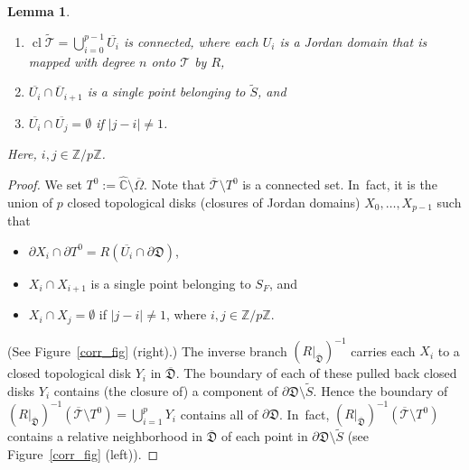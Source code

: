 \documentclass[JEP,XML,SOM,Unicode,NoFloatCountersInSection,published]{cedram}
\newtheorem{lemma}{Lemma}[section]
\theoremstyle{definition}
\theoremstyle{remark}
\newcommand{\C}{\mathbb{C}}
\newcommand{\Z}{\mathbb{Z}}
\newcommand{\cT}{\mathcal{T}}
\DeclareMathOperator{\Cl}{cl}
\begin{document}
\skpt
\begin{lemma}\label{lifted_tiling_top_lem}
\begin{enumerate}
\item $\Cl{\widetilde{\cT}}=\bigcup_{i=0}^{p-1} \overline{U_i}$ is connected, where each $U_i$ is a Jordan domain that is mapped with degree $n$ onto $\mathcal{T}$ by $R$,
\item $\overline{U_i}\cap \overline{U}_{i+1}$ is a single point belonging to $\widetilde{S}$, and
\item $\overline{U_i}\cap \overline{U_j}=\emptyset$ if $\vert j-i\vert\neq1$.
\end{enumerate}
Here, $i,j\in\Z/p\Z$.
\end{lemma}
\begin{proof}
We set $T^0:=\widehat{\C}\setminus\overline{\Omega}$. Note that $\overline{\mathcal{T}}\setminus T^0$ is a connected set. In~fact, it is the union of $p$ closed topological disks (\ie closures of Jordan domains) $X_0,\dots,X_{p-1}$ such that
\begin{itemize}
\item $\partial X_i\cap\partial T^0 = R(\overline{U_i}\cap \partial\mathfrak{D})$,
\item $X_i\cap X_{i+1}$ is a single point belonging to $S_F$, and
\item $X_i\cap X_j=\emptyset$ if $\vert j-i\vert\neq1$, where $i,j\in\Z/p\Z$.
\end{itemize}
(See Figure~\ref{corr_fig} (right).)
The inverse branch $(R\vert_{\overline{\mathfrak{D}}})^{-1}$ carries each $X_i$ to a closed topological disk $Y_i$ in $\overline{\mathfrak{D}}$. The boundary of each of these pulled back closed disks $Y_i$ contains (the closure of) a component of $\partial\mathfrak{D}\setminus\widetilde{S}$. Hence the boundary of $(R\vert_{\overline{\mathfrak{D}}})^{-1}(\overline{\mathcal{T}}\setminus T^0)=\bigcup_{i=1}^p Y_i$ contains all of $\partial\mathfrak{D}$. In~fact, $(R\vert_{\overline{\mathfrak{D}}})^{-1}(\overline{\mathcal{T}}\setminus T^0)$ contains a relative neighborhood in $\overline{\mathfrak{D}}$ of each point in $\partial\mathfrak{D}\setminus\widetilde{S}$ (see Figure~\ref{corr_fig} (left)).


\end{proof}
\end{document}
